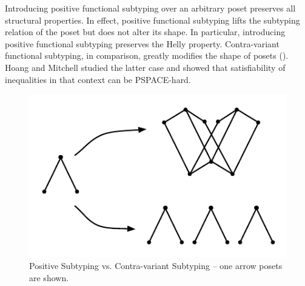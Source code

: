 \documentclass{report}
\begin{document}
  Introducing positive functional subtyping over an arbitrary poset  
  preserves all structural properties. In effect,
  positive functional subtyping lifts
  the subtyping relation of the poset but does not alter its shape. In
  particular, introducing positive functional subtyping preserves the  
  Helly property.
  Contra-variant functional subtyping, in
  comparison, greatly modifies the shape of posets (). Hoang and
  Mitchell \cite{hoang:lower-bounds} studied the latter
  case and showed that satisfiability of inequalities in that context can
  be PSPACE-hard.
  
  \begin{figure}[ht]
    \centering
    \includegraphics{images/positiveversusstd}
    \caption{Positive Subtyping vs. Contra-variant Subtyping -- one arrow posets are shown.}
  \end{figure}
  
\end{document}
